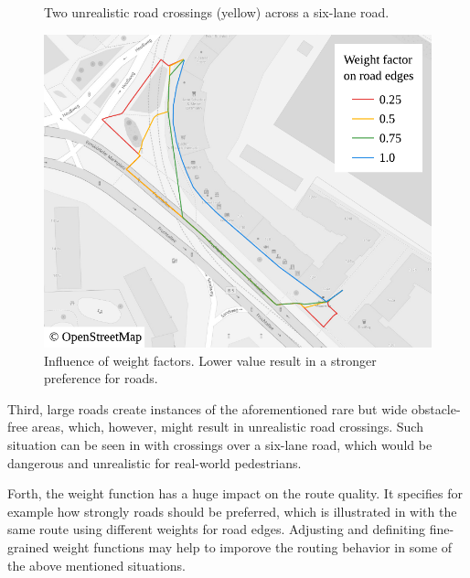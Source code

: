 \begin{figure}[h!]
\begin{minipage}[t]{.48\textwidth}
\begin{figcenter}
					\end{figcenter}
					\caption{Two unrealistic road crossings (yellow) across a six-lane road.}
					\label{fig:eval-city-road-crossing}
				\end{minipage}
				\hfill
				\begin{minipage}[t]{.48\textwidth}
					\begin{figcenter}
						\includegraphics[width=\textwidth]{images/qgis-routing-city-weights}
					\end{figcenter}
					\caption{Influence of weight factors. Lower value result in a stronger preference for roads.}
					\label{fig:eval-city-weights}
				\end{minipage}
			\end{figure}
			
			Third, large roads create instances of the aforementioned rare but wide obstacle-free areas, which, however, might result in unrealistic road crossings.
			Such situation can be seen in  with crossings over a six-lane road, which would be dangerous and unrealistic for real-world pedestrians.
			
			Forth, the weight function has a huge impact on the route quality.
			It specifies for example how strongly roads should be preferred, which is illustrated in  with the same route using different weights for road edges.
			Adjusting and definiting fine-grained weight functions may help to imporove the routing behavior in some of the above mentioned situations.
			
